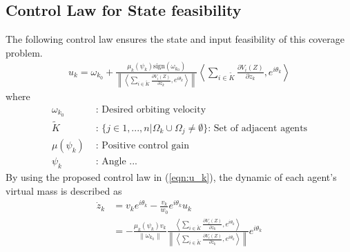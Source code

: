 \documentclass[journal]{IEEEtran}
\newcommand{\norm}[1]{\left\lVert#1\right\rVert}
\begin{document}
\subsection{Control Law for State feasibility}
\noindent The following control law ensures the state and input feasibility of this coverage problem. 
\begin{equation}
\label{eqn:u_k}
\begin{split}
u_k = \omega_{k_0} + \frac{\mu_k(\psi_{k})\text{sign}({\omega_{k_0}})}{\norm{\left <\sum_{i \in \tilde{K}}\frac{\partial V_i(Z)}{\partial z_k}, e^{i\theta_k} \right >}} \left <\sum_{i \in \tilde{K}}\frac{\partial V_i(Z)}{\partial z_k}, e^{i\theta_k} \right >
\end{split}
\end{equation}
\noindent where 
\begin{equation}
\begin{split}
\omega_{k_0} &  \text{ : Desired orbiting velocity} \\
\tilde{K} & \text{ : } \{ j \in {1,...,n}| \Omega_k \cup \Omega_j \neq \emptyset \} \text{: Set of adjacent agents}\\
\mu(\psi_{k}) & \text{ : Positive control gain} \\
\psi_{k} & \text{ : Angle ...} 
\end{split}
\end{equation}
\noindent By using the proposed control law in (\ref{eqn:u_k}), the dynamic of each agent's virtual mass is described as 
\begin{equation} \label{eqn:z_k}
\begin{split}
\dot{z}_{k}  & = v_k e^{i\theta_{k}} - \frac{v_k}{w_0}e^{i\theta_{k}}u_k \\
& = - \frac{\mu_k(\psi_{k})v_k}{\norm{\omega_{k_0}}}\frac{\left <\sum_{i \in \tilde{K}}\frac{\partial V_i(Z)}{\partial z_k}, e^{i\theta_k} \right >}{\norm{\left <\sum_{i \in \tilde{K}}\frac{\partial V_i(Z)}{\partial z_k}, e^{i\theta_k} \right >}}e^{i\theta_{k}} \\
\end{split}
\end{equation}
\end{document}
